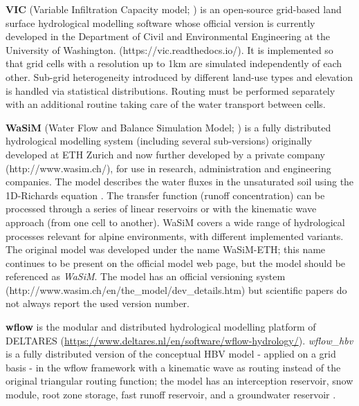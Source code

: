\documentclass[10pt,a4paper]{article}
\begin{document}
\textbf{VIC} (Variable Infiltration Capacity model; \citealp{Liang1994a}) is an open-source grid-based land surface hydrological modelling software whose official version is currently developed in the Department of Civil and Environmental Engineering at the University of Washington. (https://vic.readthedocs.io/). It is implemented so that grid cells with a resolution up to 1km are simulated independently of each other. Sub-grid heterogeneity introduced by different land-use types and elevation is handled via statistical distributions. Routing must be performed separately with an additional routine taking care of the water transport between cells.

\textbf{WaSiM} (Water Flow and Balance Simulation Model; \citealp{Schulla2007, Schulla2009}) is a fully distributed hydrological modelling system (including several sub-versions) originally developed at ETH Zurich and now further developed by a private company (http://www.wasim.ch/), for use in research, administration and engineering companies. The model describes the water fluxes in the unsaturated soil using the 1D-Richards equation \citep{Richards1931}. The transfer function (runoff concentration) can be processed through a series of linear reservoirs or with the kinematic wave approach (from one cell to another). WaSiM covers a wide range of hydrological processes relevant for alpine environments, with different implemented variants. The original model was developed under the name WaSiM-ETH; this name continues to be present on the official model web page, but the model should be referenced as \textit{WaSiM}. The model has an official versioning system (http://www.wasim.ch/en/the\_model/dev\_details.htm) but scientific papers do not always report the used version number.

\textbf{wflow} is the modular and distributed hydrological modelling platform of DELTARES (\url{https://www.deltares.nl/en/software/wflow-hydrology/}). \textit{wflow\_hbv} is a fully distributed version of the conceptual HBV model \citep{Lindstrm1997} - applied on a grid basis - in the wflow framework with a kinematic wave as routing instead of the original triangular routing function; the model has an interception reservoir, snow module, root zone storage, fast runoff reservoir, and a groundwater reservoir \citep{deBoerEuser2017}. 




\end{document}
